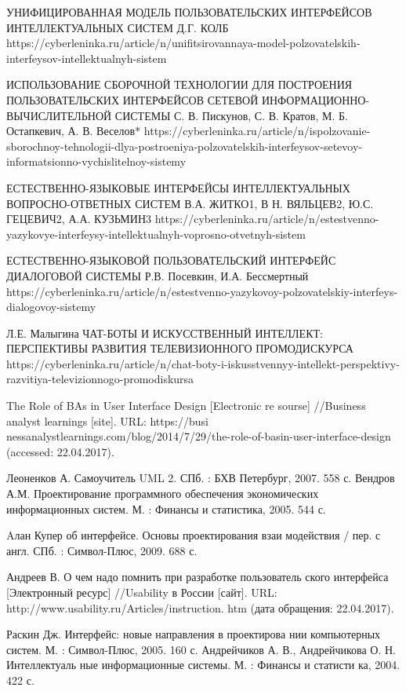 \documentclass{article}
\begin{document}
УНИФИЦИРОВАННАЯ МОДЕЛЬ ПОЛЬЗОВАТЕЛЬСКИХ ИНТЕРФЕЙСОВ
ИНТЕЛЛЕКТУАЛЬНЫХ СИСТЕМ
Д.Г. КОЛБ
https://cyberleninka.ru/article/n/unifitsirovannaya-model-polzovatelskih-interfeysov-intellektualnyh-sistem

ИСПОЛЬЗОВАНИЕ СБОРОЧНОЙ ТЕХНОЛОГИИ ДЛЯ ПОСТРОЕНИЯ ПОЛЬЗОВАТЕЛЬСКИХ ИНТЕРФЕЙСОВ СЕТЕВОЙ ИНФОРМАЦИОННО-ВЫЧИСЛИТЕЛЬНОЙ
СИСТЕМЫ
С. В. Пискунов, С. В. Кратов, М. Б. Остапкевич, А. В. Веселов*
https://cyberleninka.ru/article/n/ispolzovanie-sborochnoy-tehnologii-dlya-postroeniya-polzovatelskih-interfeysov-setevoy-informatsionno-vychislitelnoy-sistemy

 ЕСТЕСТВЕННО-ЯЗЫКОВЫЕ ИНТЕРФЕЙСЫ ИНТЕЛЛЕКТУАЛЬНЫХ ВОПРОСНО-ОТВЕТНЫХ СИСТЕМ
В.А. ЖИТКО1, В Н. ВЯЛЬЦЕВ2, Ю.С. ГЕЦЕВИЧ2, А.А. КУЗЬМИН3
https://cyberleninka.ru/article/n/estestvenno-yazykovye-interfeysy-intellektualnyh-voprosno-otvetnyh-sistem

ЕСТЕСТВЕННО-ЯЗЫКОВОЙ ПОЛЬЗОВАТЕЛЬСКИЙ ИНТЕРФЕЙС
ДИАЛОГОВОЙ СИСТЕМЫ
Р.В. Посевкин, И.А. Бессмертный https://cyberleninka.ru/article/n/estestvenno-yazykovoy-polzovatelskiy-interfeys-dialogovoy-sistemy

 Л.Е. Малыгина
ЧАТ-БОТЫ И ИСКУССТВЕННЫЙ ИНТЕЛЛЕКТ: ПЕРСПЕКТИВЫ РАЗВИТИЯ ТЕЛЕВИЗИОННОГО ПРОМОДИСКУРСА 
https://cyberleninka.ru/article/n/chat-boty-i-iskusstvennyy-intellekt-perspektivy-razvitiya-televizionnogo-promodiskursa

The Role of BAs in User Interface Design [Electronic re  sourse] //Business analyst learnings [site]. URL: https://busi  nessanalystlearnings.com/blog/2014/7/29/the-role-of-basin-user-interface-design (accessed: 22.04.2017). 

Леоненков А. Самоучитель UML 2. СПб. : БХВ Петербург, 2007. 558 с.
 Вендров А.М. Проектирование программного обеспечения экономических информационных систем. М. : Финансы и статистика, 2005. 544 с.

Aлан Купер об интерфейсе. Основы проектирования взаи  модействия / пер. с англ. СПб. : Символ-Плюс, 2009. 688 с.

Андреев В. О чем надо помнить при разработке пользователь  ского интерфейса [Электронный ресурс] //Usability в России [сайт]. URL: http://www.usability.ru/Articles/instruction. htm (дата обращения: 22.04.2017).

 Раскин Дж. Интерфейс: новые направления в проектирова  нии компьютерных систем. М. : Символ-Плюс, 2005. 160 с.
 Андрейчиков А. В., Андрейчикова О. Н. Интеллектуаль  ные информационные системы. М. : Финансы и статисти  ка, 2004. 422 с.
\end{document}
